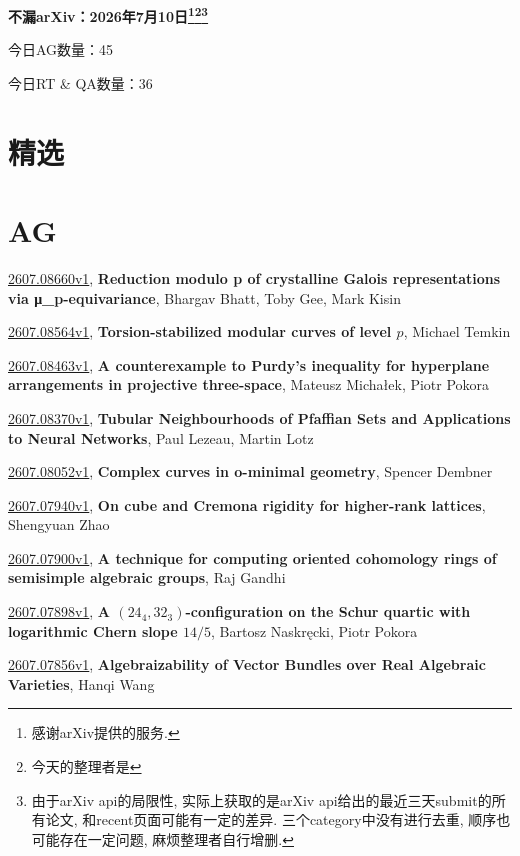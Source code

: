 \documentclass[9pt, a4paper]{article}
\theoremstyle{plain}
\theoremstyle{definition}
\theoremstyle{remark}
\newcommand{\arxiv}[3]{\href{https://arxiv.org/abs/#1}{#1}, \textbf{\textcolor{arxivblue}{#2}}, #3}
\newcommand{\AGnumber}{45}
\newcommand{\RTQAnumber}{36}
\newcommand{\NewestDate}{2026年7月10日}
\newcommand{\todayarXiver}{} %
\begin{document}
\begin{center}
    \Huge\textbf{不漏arXiv：\NewestDate\footnote{感谢arXiv提供的服务.}\footnote{今天的整理者是\todayarXiver}\footnote{由于arXiv api的局限性, 实际上获取的是arXiv api给出的最近三天submit的所有论文, 和recent页面可能有一定的差异. 三个category中没有进行去重, 顺序也可能存在一定问题, 麻烦整理者自行增删.}} \\
\end{center}

\setcounter{section}{-1}

\begin{center}
    今日AG数量：\AGnumber
    
    今日RT \& QA数量：\RTQAnumber
    
\end{center}


\section{精选}


\section{AG}
\arxiv{2607.08660v1}{Reduction modulo p of crystalline Galois representations via μ_p-equivariance}{Bhargav Bhatt, Toby Gee, Mark Kisin}

\arxiv{2607.08564v1}{Torsion-stabilized modular curves of level $p$}{Michael Temkin}

\arxiv{2607.08463v1}{A counterexample to Purdy's inequality for hyperplane arrangements in projective three-space}{Mateusz Michałek, Piotr Pokora}

\arxiv{2607.08370v1}{Tubular Neighbourhoods of Pfaffian Sets and Applications to Neural Networks}{Paul Lezeau, Martin Lotz}

\arxiv{2607.08052v1}{Complex curves in o-minimal geometry}{Spencer Dembner}

\arxiv{2607.07940v1}{On cube and Cremona rigidity for higher-rank lattices}{Shengyuan Zhao}

\arxiv{2607.07900v1}{A technique for computing oriented cohomology rings of semisimple algebraic groups}{Raj Gandhi}

\arxiv{2607.07898v1}{A $(24_4,32_3)$-configuration on the Schur quartic with logarithmic Chern slope $14/5$}{Bartosz Naskręcki, Piotr Pokora}

\arxiv{2607.07856v1}{Algebraizability of Vector Bundles over Real Algebraic Varieties}{Hanqi Wang}
\end{document}
